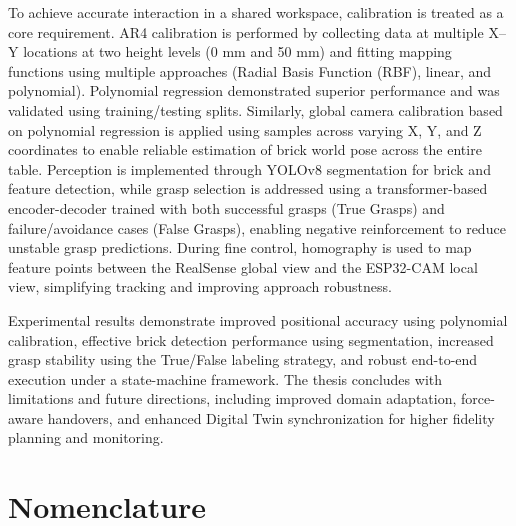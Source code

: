 \documentclass[11pt,a4paper,twoside]{report}
\begin{document}
\setlength{\parskip}{1em}
To achieve accurate interaction in a shared workspace, calibration is treated as a core requirement. AR4 calibration is performed by collecting data at multiple X--Y locations at two height levels (0 mm and 50 mm) and fitting mapping functions using multiple approaches (Radial Basis Function (RBF), linear, and polynomial). Polynomial regression demonstrated superior performance and was validated using training/testing splits. Similarly, global camera calibration based on polynomial regression is applied using samples across varying X, Y, and Z coordinates to enable reliable estimation of brick world pose across the entire table. Perception is implemented through YOLOv8 segmentation for brick and feature detection, while grasp selection is addressed using a transformer-based encoder-decoder trained with both successful grasps (True Grasps) and failure/avoidance cases (False Grasps), enabling negative reinforcement to reduce unstable grasp predictions. During fine control, homography is used to map feature points between the RealSense global view and the ESP32-CAM local view, simplifying tracking and improving approach robustness.

\setlength{\parskip}{1em}
Experimental results demonstrate improved positional accuracy using polynomial calibration, effective brick detection performance using segmentation, increased grasp stability using the True/False labeling strategy, and robust end-to-end execution under a state-machine framework. The thesis concludes with limitations and future directions, including improved domain adaptation, force-aware handovers, and enhanced Digital Twin synchronization for higher fidelity planning and monitoring.
\clearpage

\begingroup
\makeatletter
\let\ps@plain\ps@fancy %
\tableofcontents
\listoffigures
\makeatother
\endgroup
\clearpage

\listoftables
\thispagestyle{fancy}
\clearpage
\chapter*{Nomenclature}
\thispagestyle{fancy}
\end{document}
